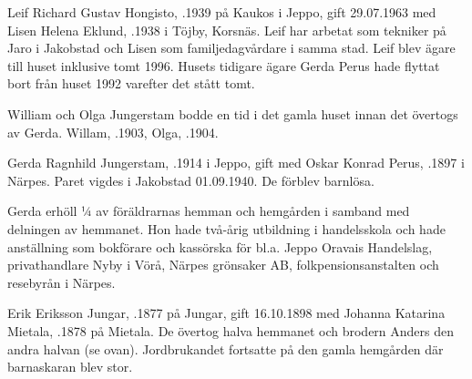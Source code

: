 Leif Richard Gustav Hongisto, .1939 på Kaukos i Jeppo, gift 29.07.1963 med Lisen Helena Eklund, .1938 i Töjby, Korsnäs. Leif har arbetat som tekniker på Jaro i Jakobstad och Lisen som familjedagvårdare i samma stad. Leif blev ägare till  huset inklusive tomt 1996. Husets tidigare ägare Gerda Perus hade flyttat bort från huset 1992 varefter det stått tomt.

William och Olga Jungerstam bodde en tid i det gamla huset innan det övertogs av Gerda. Willam, .1903, Olga, .1904.



Gerda Ragnhild Jungerstam, .1914 i Jeppo, gift med Oskar Konrad Perus, .1897 i Närpes. Paret vigdes i Jakobstad 01.09.1940. De förblev barnlösa.

Gerda erhöll ¼ av föräldrarnas hemman och hemgården i samband med delningen av hemmanet. Hon hade två-årig utbildning i handelsskola och hade anställning som bokförare och kassörska för bl.a. Jeppo Oravais Handelslag, privathandlare Nyby i Vörå, Närpes grönsaker AB, folkpensionsanstalten och resebyrån i Närpes.


Erik Eriksson Jungar, .1877 på Jungar, gift 16.10.1898 med Johanna Katarina Mietala, .1878 på Mietala. De övertog halva hemmanet och brodern Anders den andra halvan (se ovan). Jordbrukandet fortsatte på den gamla hemgården där barnaskaran blev stor.
\begin{jhchildren}
  \item {}
  \item {}
  \item {}
  \item {}
  \item {}
  \item {}
  \item {}
  \item {}
  \item {}
  \item {}
\end{jhchildren}


